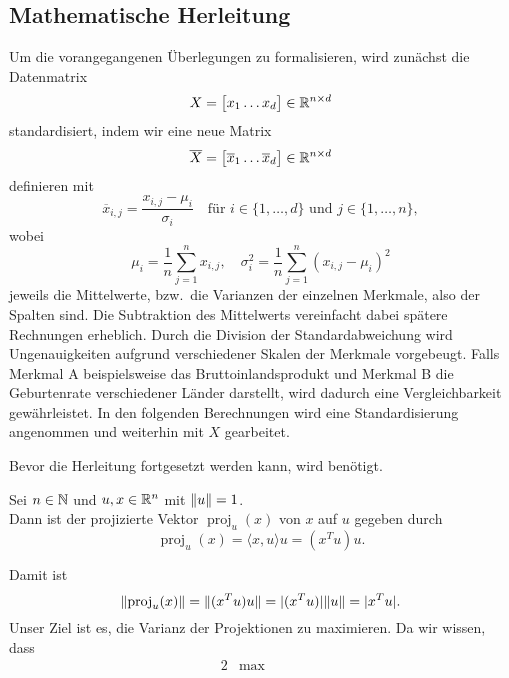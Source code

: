 \subsection{Mathematische Herleitung}

Um die vorangegangenen Überlegungen zu formalisieren, wird zunächst die Datenmatrix
\begin{equation*}
    X = 
    \big[
        \begin{matrix}
            x_1 \dots x_d
        \end{matrix}    
    \big] \in \mathbb{R}^{n \times d}
\end{equation*} 
standardisiert, indem wir eine neue Matrix 
\begin{equation*}
    \overline{X} = 
        \begin{bmatrix}
            \overline{x}_1 \dots \overline{x}_d
        \end{bmatrix} \in \mathbb{R}^{n \times d}
\end{equation*} 
definieren mit 
\begin{equation*}
    \overline{x}_{i,j} = \frac{x_{i,j}-\mu_i}{\sigma_i} \quad \text{für } i \in \{1,\ldots,d\} \text{ und } j \in \{1,\ldots,n\},
\end{equation*}  
wobei 
\begin{equation*}
    \mu_i = \frac{1}{n}\sum_{j=1}^{n}x_{i,j}, \quad \sigma_{i}^{2} = \frac{1}{n}\sum_{j=1}^{n}{(x_{i,j} - \mu_{i})}^{2}
\end{equation*}
jeweils die Mittelwerte, bzw.\ die Varianzen der einzelnen Merkmale, also der Spalten sind.
Die Subtraktion des Mittelwerts vereinfacht dabei spätere Rechnungen erheblich.
Durch die Division der Standardabweichung wird Ungenauigkeiten aufgrund verschiedener Skalen der Merkmale vorgebeugt.
Falls Merkmal A beispielsweise das Bruttoinlandsprodukt und Merkmal B die Geburtenrate verschiedener Länder darstellt, wird dadurch eine Vergleichbarkeit gewährleistet.
In den folgenden Berechnungen wird eine Standardisierung angenommen und weiterhin mit \(X\) gearbeitet.

Bevor die Herleitung fortgesetzt werden kann, wird  benötigt.
\begin{repitition}\label{rep:proj}
    Sei \(n \in \mathbb{N}\) und \(u,x \in \mathbb{R}^{n}\) mit \(\lVert u\rVert = 1\).  \\
    Dann ist der projizierte Vektor \(\operatorname{proj}_{u}(x)\) von \(x\) auf \(u\) gegeben durch
    \begin{equation*}
        \operatorname{proj}_{u}(x) = \langle x,u \rangle u = (x^{T}u)u.
    \end{equation*}     
\end{repitition}
Damit ist 
\begin{equation*}
    \lVert\operatorname{proj}_{u}(x)\rVert = \lVert(x^{T}u)u\rVert =  \lvert(x^{T}u)\rvert\lVert u\rVert = \lvert x^{T}u\rvert.
\end{equation*}
Unser Ziel ist es, die Varianz der Projektionen zu maximieren.
Da wir wissen, dass 
\begin{alignat*}{2}
    &\max \quad &&
\end{alignat*}